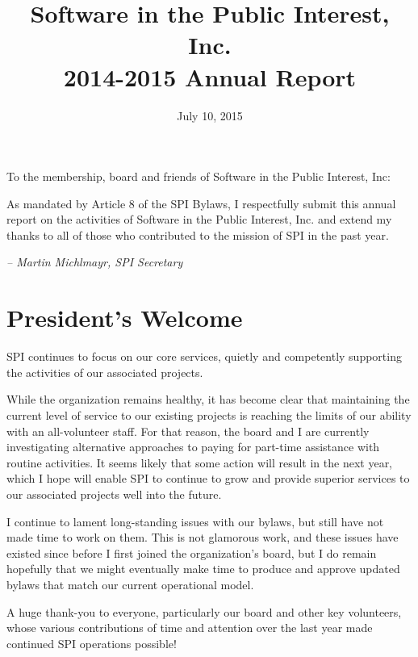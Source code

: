 \documentclass[letterpaper]{report}
\begin{document}
\title{Software in the Public Interest, Inc.\\
2014-2015 Annual Report}
\date{July 10, 2015}

\maketitle

To the membership, board and friends of Software in the Public Interest, Inc:

As mandated by Article 8 of the SPI Bylaws, I respectfully submit this annual
report on the activities of Software in the Public Interest, Inc. and extend my
thanks to all of those who contributed to the mission of SPI in the past year.

  \emph{-- Martin Michlmayr, SPI Secretary}

\newpage

\tableofcontents

\newpage

\chapter{President's Welcome}
\label{sec:president}

SPI continues to focus on our core services, quietly and competently
supporting the activities of our associated projects.

While the organization remains healthy, it has become clear that
maintaining the current level of service to our existing projects is
reaching the limits of our ability with an all-volunteer staff.  For that
reason, the board and I are currently investigating alternative approaches
to paying for part-time assistance with routine activities.  It seems
likely that some action will result in the next year, which I hope will
enable SPI to continue to grow and provide superior services to our
associated projects well into the future.

I continue to lament long-standing issues with our bylaws, but still have
not made time to work on them.  This is not glamorous work, and these
issues have existed since before I first joined the organization's board,
but I do remain hopefully that we might eventually make time to produce and
approve updated bylaws that match our current operational model.

A huge thank-you to everyone, particularly our board and other key
volunteers, whose various contributions of time and attention over the last
year made continued SPI operations possible!
\end{document}
